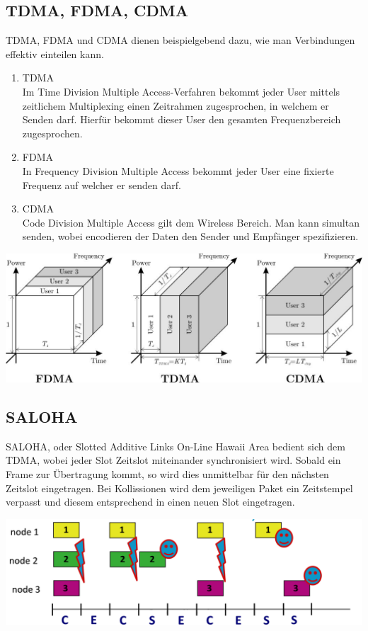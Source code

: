 \documentclass{scrartcl}
\begin{document}
    \subsection{TDMA, FDMA, CDMA}
    TDMA, FDMA und CDMA dienen beispielgebend dazu, wie man Verbindungen effektiv einteilen kann.
    \begin{enumerate}
        \item TDMA\\
        Im Time Division Multiple Access-Verfahren bekommt jeder User mittels zeitlichem Multiplexing einen Zeitrahmen zugesprochen, in welchem er Senden darf. Hierfür bekommt dieser User den gesamten Frequenzbereich zugesprochen.
        \item FDMA\\
        In Frequency Division Multiple Access bekommt jeder User eine fixierte Frequenz auf welcher er senden darf.
        \item CDMA\\
        Code Division Multiple Access gilt dem Wireless Bereich. Man kann simultan senden, wobei encodieren der Daten den Sender und Empfänger spezifizieren.
    \end{enumerate}
    \begin{center}
        \includegraphics[width=\textwidth]{TDMACDMAFDMA.jpg}
    \end{center}
    
    \subsection{SALOHA}
    SALOHA, oder Slotted Additive Links On-Line Hawaii Area bedient sich dem TDMA, wobei jeder Slot Zeitslot miteinander synchronisiert wird.
    Sobald ein Frame zur Übertragung kommt, so wird dies unmittelbar für den nächsten Zeitslot eingetragen. Bei Kollissionen wird dem jeweiligen Paket ein Zeitstempel verpasst und diesem entsprechend in einen neuen Slot eingetragen.
    \begin{center}
        \includegraphics[width=\textwidth]{Aloha.png}
    \end{center}
    
\end{document}
